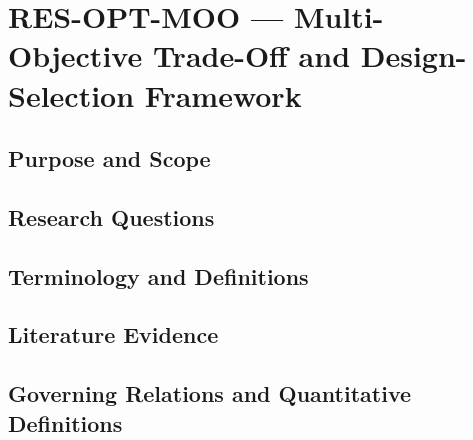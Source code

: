 
\section{RES-OPT-MOO --- Multi-Objective Trade-Off and Design-Selection Framework}
\label{sec:res-opt-moo}

\subsection{Purpose and Scope}
\label{sec:res-opt-moo-purpose}


\subsection{Research Questions}
\label{sec:res-opt-moo-research-questions}


\subsection{Terminology and Definitions}
\label{sec:res-opt-moo-definitions}


\subsection{Literature Evidence}
\label{sec:res-opt-moo-literature-evidence}

%

\subsection{Governing Relations and Quantitative Definitions}
\label{sec:res-opt-moo-governing-relations}

